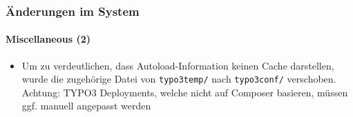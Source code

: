 \begin{frame}[fragile]
	\frametitle{Änderungen im System}
	\framesubtitle{Miscellaneous (2)}

	\begin{itemize}

		\item Um zu verdeutlichen, dass Autoload-Information keinen Cache darstellen, wurde die zugehörige
			Datei von \texttt{typo3temp/} nach \texttt{typo3conf/} verschoben.\newline
			\smaller
				Achtung: TYPO3 Deployments, welche nicht auf Composer basieren, müssen ggf. manuell angepasst werden
			\normalsize

	\end{itemize}

\end{frame}


